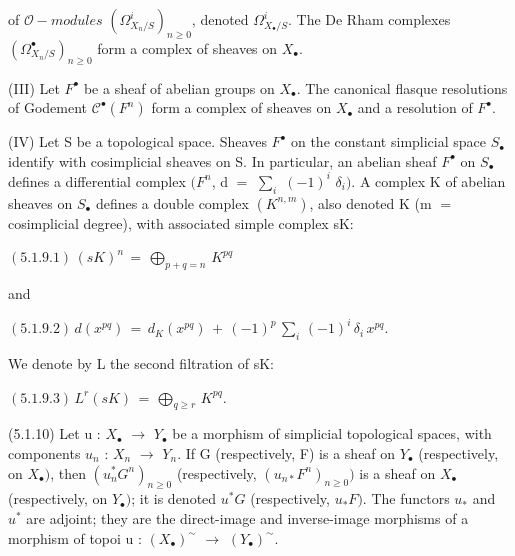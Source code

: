 \documentclass[11pt,twoside]{article}
\newcommand{\DFormula}[1]{%
  \par\smallskip\noindent\hspace*{0pt}\(\displaystyle #1\)\par\smallskip
}
\begin{document}
of \(\mathcal{O}-modules\) \((\Omega ^{i}_{X_{n}/S})_{n\geq 0}\), denoted \(\Omega ^{i}_{X_{\bullet }/S}\). The De Rham complexes \((\Omega ^{\bullet }_{X_{n}/S})_{n\geq 0}\) form a complex of sheaves on \(X_{\bullet }\).\par
\par\medskip
(III) Let \(F^{\bullet }\) be a sheaf of abelian groups on \(X_{\bullet }\). The canonical flasque resolutions of Godement \(\mathcal{C}^{\bullet }(F^{n})\) form a complex of sheaves on \(X_{\bullet }\) and a resolution of \(F^{\bullet }\).\par
\par\medskip
(IV) Let S be a topological space. Sheaves \(F^{\bullet }\) on the constant simplicial space \(S_{\bullet }\) identify with cosimplicial sheaves on S. In particular, an abelian sheaf \(F^{\bullet }\) on \(S_{\bullet }\) defines a differential complex \((F^{n}\), d \(=\) \(\sum _{i}\) \((−1)^{i}\) \(\delta _{i})\). A complex K of abelian sheaves on \(S_{\bullet }\) defines a double complex \((K^{n,m})\), also denoted K (m \(=\) cosimplicial degree), with associated simple complex sK:\par
\par\medskip
\DFormula{(5.1.9.1)\,(sK)^{n}\,=\,⨁_{p+q=n}\,K^{pq}}
\par\medskip
and\par
\par\medskip
\DFormula{(5.1.9.2)\,d(x^{pq})\,=\,d_{K}(x^{pq})\,+\,(−1)^{p}\,\sum _{i}\,(−1)^{i}\,\delta _{i}\,x^{pq}.}
\par\medskip
We denote by L the second filtration of sK:\par
\par\medskip
\DFormula{(5.1.9.3)\,L^{r}(sK)\,=\,⨁_{q\geq r}\,K^{pq}.}
\par\medskip
(5.1.10) Let u : \(X_{\bullet }\) \(\to \) \(Y_{\bullet }\) be a morphism of simplicial topological spaces, with components \(u_{n}\) : \(X_{n}\) \(\to \) \(Y_{n}\). If G (respectively, F) is a sheaf on \(Y_{\bullet }\) (respectively, on \(X_{\bullet })\), then \((u_{n}^{\ast }G^{n})_{n\geq 0}\) (respectively, \((u_{n\ast }F^{n})_{n\geq 0})\) is a sheaf on \(X_{\bullet }\) (respectively, on \(Y_{\bullet })\); it is denoted \(u^{\ast }G\) (respectively, \(u_{\ast }F)\). The functors \(u_{\ast }\) and \(u^{\ast }\) are adjoint; they are the direct-image and inverse-image morphisms of a morphism of topoi u : \((X_{\bullet })^{\sim }\) \(\to \) \((Y_{\bullet })^{\sim }\).\par
\par\medskip
\end{document}
